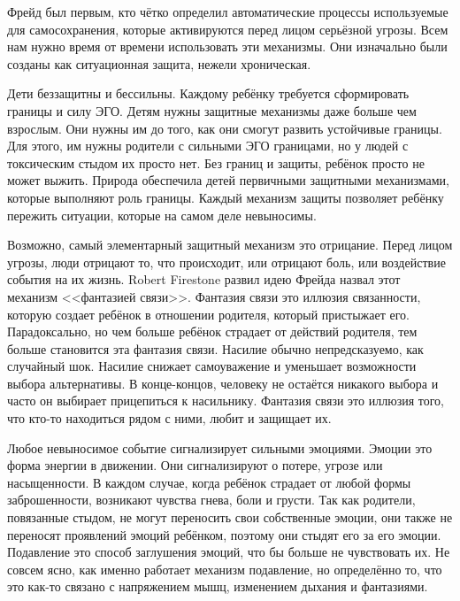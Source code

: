 \documentclass[10pt, fleqn]{article}
\begin{document}
Фрейд был первым, кто чётко определил автоматические процессы используемые для самосохранения, которые активируются перед лицом серьёзной угрозы. Всем нам нужно время от времени использовать эти механизмы. Они изначально были созданы как ситуационная защита, нежели хроническая.

Дети беззащитны и бессильны. Каждому ребёнку требуется сформировать границы и силу ЭГО. Детям нужны защитные механизмы даже больше чем взрослым. Они нужны им до того, как они смогут развить устойчивые границы. Для этого, им нужны родители с сильными ЭГО границами, но у людей с токсическим стыдом их просто нет. Без границ и защиты, ребёнок просто не может выжить. Природа обеспечила детей первичными защитными механизмами, которые выполняют роль границы. Каждый механизм защиты позволяет ребёнку пережить ситуации, которые на самом деле невыносимы.


Возможно, самый элементарный защитный механизм это отрицание. Перед лицом угрозы, люди отрицают то, что происходит, или отрицают боль, или воздействие события на их жизнь.
Robert Firestone развил идею Фрейда назвал этот механизм <<фантазией связи>>. Фантазия связи это иллюзия связанности, которую создает ребёнок в отношении родителя, который пристыжает его.
Парадоксально, но чем больше ребёнок страдает от действий родителя, тем больше становится эта фантазия связи.
Насилие обычно непредсказуемо, как случайный шок. Насилие снижает самоуважение и уменьшает возможности выбора альтернативы.
В конце-концов, человеку не остаётся никакого выбора и часто он выбирает прицепиться к насильнику. Фантазия связи это иллюзия того, что кто-то находиться рядом с ними, любит и защищает их.


Любое невыносимое событие сигнализирует сильными эмоциями. Эмоции это форма энергии в движении. Они сигнализируют о потере, угрозе или насыщенности. В каждом случае, когда ребёнок страдает от любой формы заброшенности, возникают чувства гнева, боли и грусти. Так как родители, повязанные стыдом, не могут переносить свои собственные эмоции, они также не переносят проявлений эмоций ребёнком, поэтому они стыдят его за его эмоции. Подавление это способ заглушения эмоций, что бы больше не чувствовать их. Не совсем ясно, как именно работает механизм подавление, но определённо то, что это как-то связано с напряжением мышц, изменением дыхания и фантазиями.

\end{document}
